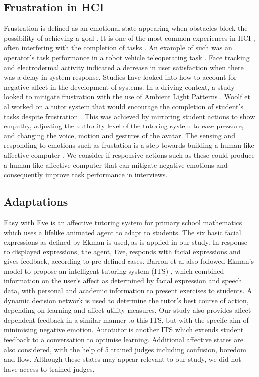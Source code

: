 \documentclass[12pt,a4paper]{article}
\begin{document}
\subsection{Frustration in HCI}
Frustration is defined as an emotional state appearing when obstacles block the possibility of achieving a goal \cite{lawson1965frustration}. It is one of the most common experiences in HCI \cite{ceaparu2004determining}, often interfering with the completion of tasks \cite{waterhouse1953frustration}. An example of such was an operator's task performance in a robot vehicle teleoperating task \cite{yang2015effect}. Face tracking and electrodermal activity indicated a decrease in user satisfaction when there was a delay in system response. Studies have looked into how to account for negative affect in the development of systems. In a driving context, a study looked to mitigate frustration with the use of Ambient Light Patterns \cite{locken2017towards}. Woolf et al worked on a tutor system that would encourage the completion of student's tasks despite frustration \cite{woolf2009affect}. This was achieved by mirroring student actions to show empathy, adjusting the authority level of the tutoring system to ease pressure, and changing the voice, motion and gestures of the avatar. The sensing and responding to emotions such as frustation is a step towards building a human-like affective computer \cite{klein2002computer}. We consider if responsive actions such as these could produce a human-like affective computer that can mitigate negative emotions and consequently improve task performance in interviews. 
\subsection{Adaptations}
Easy with Eve is an affective tutoring system for primary school mathematics which uses a lifelike animated agent to adapt to students. The six basic facial expressions as defined by Ekman \cite{ekman1992argument} is used, as is applied in our study. In response to displayed expressions, the agent, Eve, responds with facial expressions and gives feedback, according to pre-defined cases. Barron et al also followed Ekman's model to propose an intelligent tutoring system (ITS) \cite{barron2012intelligent}, which combined information on the user's affect as determined by facial expression and speech data, with personal and academic information to present exercises to students. A dynamic decision network is used to determine the tutor's best course of action, depending on learning and affect utility measures. Our study also provides affect-dependent feedback in a similar manner to this ITS, but with the specifc aim of minimising negative emotion. Autotutor is another ITS which extends student feedback to a conversation to optimise learning. Additional affective states are also considered, with the help of 5 trained judges including confusion, boredom and flow. Although these states may appear relevant to our study, we did not have access to trained judges.
\end{document}
